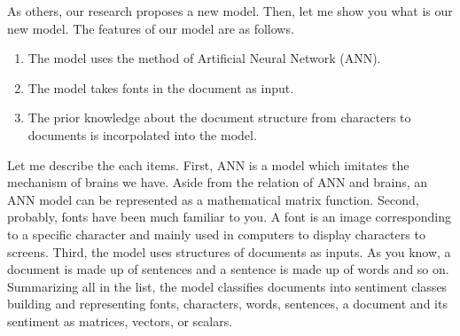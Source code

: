 \documentclass{notes}
\begin{document}
As others, our research proposes a new model.
Then, let me show you what is our new model.
The features of our model are as follows.
\begin{enumerate}
  \item The model uses the method of Artificial Neural Network (ANN).
  \item The model takes fonts in the document as input.
  \item The prior knowledge about the document structure
        from characters to documents is incorpolated into the model.
\end{enumerate}
Let me describe the each items.
First, ANN is a model which imitates the mechanism of brains we have.
Aside from the relation of ANN and brains, an ANN model can be represented
as a mathematical matrix function.
Second, probably, fonts have been much familiar to you.
A font is an image corresponding to a specific character
and mainly used in computers to display characters to screens.
Third, the model uses structures of documents as inputs.
As you know, a document is made up of sentences
and a sentence is made up of words and so on.
Summarizing all in the list,
the model classifies documents into sentiment classes
building and representing fonts, characters, words, sentences, a document
and its sentiment as matrices, vectors, or scalars.
\end{document}
